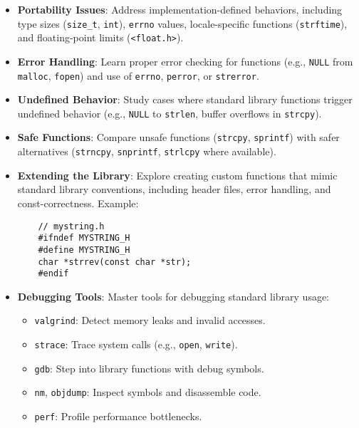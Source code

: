 \documentclass[a4paper,12pt]{article}
\begin{document}
\begin{itemize}[noitemsep]
    \item \textbf{Portability Issues}: Address implementation-defined behaviors, including type sizes (\texttt{size\_t}, \texttt{int}), \texttt{errno} values, locale-specific functions (\texttt{strftime}), and floating-point limits (\texttt{<float.h>}).

    \item \textbf{Error Handling}: Learn proper error checking for functions (e.g., \texttt{NULL} from \texttt{malloc}, \texttt{fopen}) and use of \texttt{errno}, \texttt{perror}, or \texttt{strerror}.

    \item \textbf{Undefined Behavior}: Study cases where standard library functions trigger undefined behavior (e.g., \texttt{NULL} to \texttt{strlen}, buffer overflows in \texttt{strcpy}).

    \item \textbf{Safe Functions}: Compare unsafe functions (\texttt{strcpy}, \texttt{sprintf}) with safer alternatives (\texttt{strncpy}, \texttt{snprintf}, \texttt{strlcpy} where available).

    \item \textbf{Extending the Library}: Explore creating custom functions that mimic standard library conventions, including header files, error handling, and const-correctness. Example:

    \begin{lstlisting}
    // mystring.h
    #ifndef MYSTRING_H
    #define MYSTRING_H
    char *strrev(const char *str);
    #endif
    \end{lstlisting}

    \item \textbf{Debugging Tools}: Master tools for debugging standard library usage:
    \begin{itemize}
        \item \texttt{valgrind}: Detect memory leaks and invalid accesses.
        \item \texttt{strace}: Trace system calls (e.g., \texttt{open}, \texttt{write}).
        \item \texttt{gdb}: Step into library functions with debug symbols.
        \item \texttt{nm}, \texttt{objdump}: Inspect symbols and disassemble code.
        \item \texttt{perf}: Profile performance bottlenecks.
    \end{itemize}


\end{itemize}
\end{document}
